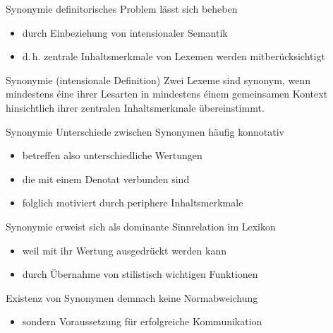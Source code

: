 \begin{frame}{Synonymie}
\onslide<+->
definitorisches Problem lässt sich beheben
\begin{itemize}[<+->]
	\item		durch Einbeziehung von intensionaler Semantik
	\item		d.\,h. zentrale Inhaltsmerkmale von Lexemen werden mitberücksichtigt
\end{itemize}
\onslide<+->
\Zeile
\begin{block}{Synonymie (intensionale Definition)}
Zwei Lexeme sind synonym, wenn mindestens éine ihrer Lesarten in mindestens éinem gemeinsamen Kontext hinsichtlich ihrer zentralen Inhaltsmerkmale übereinstimmt. \citep[67 (modifiziert)]{Harm2015}
\end{block}
\end{frame}

\begin{frame}{Synonymie}
\onslide<+->
Unterschiede zwischen Synonymen häufig konnotativ
\begin{itemize}[<+->]
	\item		betreffen also unterschiedliche Wertungen
	\item		die mit einem Denotat verbunden sind
	\item		folglich motiviert durch periphere Inhaltsmerkmale
\end{itemize}
\onslide<+->
\Zeile
\begin{exe}
	\ex\label{ex:synonymie-008}
    \begin{xlist}
		 \onslide<+->
		 \onslide<+->
		 \onslide<+->
	\end{xlist}
\end{exe}
\end{frame}

\begin{frame}{Synonymie}
\onslide<+->
erweist sich als dominante Sinnrelation im Lexikon
\begin{itemize}[<+->]
	\item		weil mit ihr Wertung ausgedrückt werden kann
	\item		durch Übernahme von stilistisch wichtigen Funktionen
\end{itemize}
\onslide<+->
\Zeile
Existenz von Synonymen demnach keine Normabweichung
\begin{itemize}[<+->]
	\item		sondern Voraussetzung für erfolgreiche Kommunikation
\end{itemize}
\end{frame}

